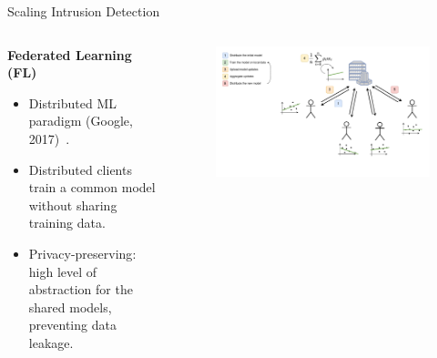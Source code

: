 \begin{frame}{Scaling Intrusion Detection}

  \begin{columns}
    \begin{column}{0.4\textwidth}
      \textbf{Federated Learning (FL)}
      \small
      \begin{itemize}[<+->]
        \item Distributed ML paradigm (Google, 2017)~\autocite{mcmahan_Communicationefficientlearningdeep_2017}.
        \item Distributed clients  train a common model without sharing training data.
        \item \alert{Privacy-preserving}: high level of abstraction for the shared models, preventing data leakage.
      \end{itemize}
    \end{column}
    
    \begin{column}{0.6\textwidth}
      \begin{figure}
        \centering
        \includegraphics[width=1.1\linewidth,center]{figures/intro/fl.drawio.pdf}
      \end{figure}
    \end{column}
  \end{columns}

\end{frame}

